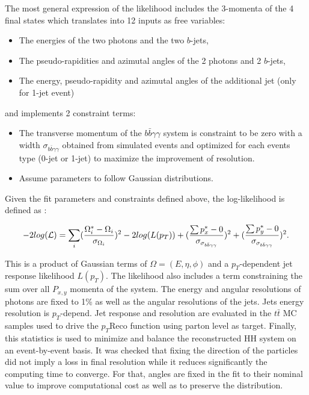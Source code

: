 The most general expression of the likelihood includes the 3-momenta of the 4 final states which translates into 12 inputs as free variables:
\begin{itemize}
    \item The energies of the two photons and the two $b$-jets,
    \item The pseudo-rapidities and azimutal angles of the 2 photons and 2 $b$-jets,
    \item The energy, pseudo-rapidity and azimutal angles of the additional jet (only for 1-jet event)
\end{itemize}
and implements 2 constraint terms:
\begin{itemize}
    \item The transverse momentum of the $b\bar{b}\gamma\gamma$ system is constraint to be zero with a width $\sigma_{b\bar{b}\gamma\gamma}$ obtained from simulated \HHyybb events and optimized for each events type (0-jet or 1-jet) to maximize the improvement of \mbb resolution.
    \item Assume parameters to follow Gaussian distributions.
\end{itemize}

Given the fit parameters and constraints defined above, the log-likelihood is defined as :

\begin{equation}
    \centering
    -2log(\mathcal{L}) = \sum_{i} (\frac{\Omega_i^*-\Omega_i}{\sigma_{\Omega_i}})^2 - 2log(L(p_T)) + (\frac{ \sum p_x^*-0}{\sigma_{\sigma_{b\bar{b}\gamma\gamma}}})^2 + (\frac{ \sum p_y^*-0}{\sigma_{\sigma_{b\bar{b}\gamma\gamma}}})^2.
\end{equation}

This is a product of Gaussian terms of $\Omega = (E, \eta, \phi)$ and a $p_T$-dependent jet response likelihood $L(p_T)$. The likelihood also includes a term constraining the sum over all $P_{x,y}$ momenta of the system. The energy and angular resolutions of photons are fixed to 1\% as well as the angular resolutions of the jets. Jets energy resolution is $p_T$-depend. Jet response and resolution are evaluated in the $t\bar{t}$ MC samples used to drive the $p_T$Reco function using parton level as target. Finally, this statistics is used to minimize and balance the reconstructed HH system on an event-by-event basis. It was checked that fixing the direction of the particles did not imply a loss in final resolution while it reduces significantly the computing time to converge. For that, angles are fixed in the fit to their nominal value to improve computational cost as well as to preserve the \myy distribution.  
